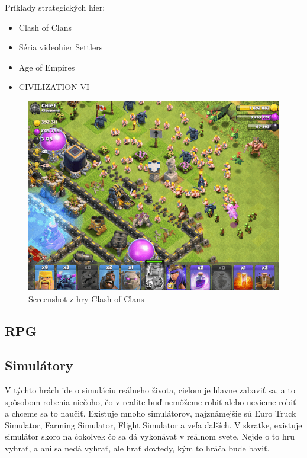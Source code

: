 \documentclass[10pt,twoside,slovak,a4paper]{article}
\begin{document}
Príklady strategických hier:
\begin{itemize}
\item Clash of Clans
\item Séria videohier Settlers
\item Age of Empires
\item CIVILIZATION VI
\end{itemize}

\begin{figure}[tbh]
\centering
\includegraphics[scale=0.3]{coc.jpg}
\caption{Screenshot z hry Clash of Clans}
\label{f:coc}
\end{figure}

\subsection{RPG} \label{zanre:rpg}



\subsection{Simulátory} \label{zanre:simulatory}

V týchto hrách ide o simuláciu reálneho života, cielom je hlavne zabaviť sa, a to spôsobom robenia niečoho, čo v realite buď nemôžeme robiť alebo nevieme robiť a chceme sa to naučiť. Existuje mnoho simulátorov, najznámejšie sú Euro Truck Simulator, Farming Simulator, Flight Simulator a veľa ďalších. V skratke, existuje simulátor skoro na čokoľvek čo sa dá vykonávať v reálnom svete. Nejde o to hru vyhrať, a ani sa nedá vyhrať, ale hrať dovtedy, kým to hráča bude baviť.
\end{document}

